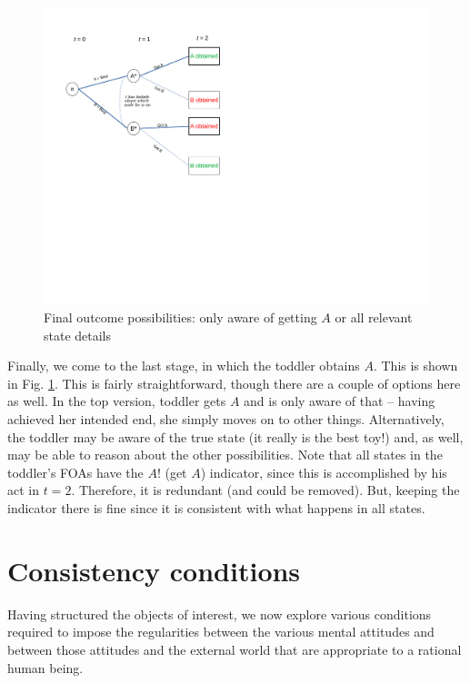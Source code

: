 \documentclass[
11pt,
titlepage,
reqno,
]{article}%
\theoremstyle{definition}
\begin{document}
\begin{figure}[h!]
	\centering
	\includegraphics*[page=20,trim = 0in 0in 2in 0in,scale=.65]{Awareness_Diagrams_All}
	\caption{Final outcome possibilities: only aware of getting $A$ or all relevant state details\label{Diag: p-20}}%
\end{figure}

Finally, we come to the last stage, in which the toddler obtains $A$. This is shown in Fig. \ref{Diag: p-20}. This is fairly straightforward, though there are a couple of options here as well. In the top version, toddler gets $A$ and is only aware of that -- having achieved her intended end, she simply moves on to other things. Alternatively, the toddler may be aware of the true state (it really is the best toy!) and, as well, may be able to reason about the other possibilities. Note that all states in the toddler's FOAs have the $A!$ (get $A$) indicator, since this is accomplished by his act in $t=2$. Therefore, it is redundant (and could be removed). But, keeping the indicator there is fine since it is consistent with what happens in all states. 
	

	\section{Consistency conditions\label{sec:consistencies}}
	
	Having structured the objects of interest, we now explore various conditions required to impose the regularities between the various mental attitudes and between those attitudes and the external world that are appropriate to a rational human being. 
	
\end{document}
